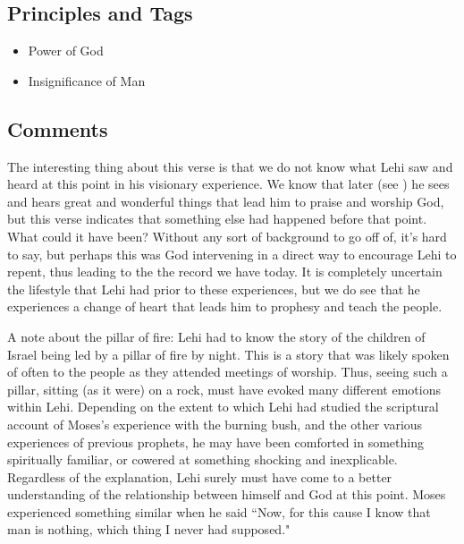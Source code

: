 \documentclass[12pt]{report}
\begin{document}
\subsection{Principles and Tags\label{1Nephi1:6:principles}}
\begin{itemize}
\item {}Power of God
\item {}Insignificance of Man
\end{itemize}

\subsection{Comments\label{1Nephi1:6:comments}}
The interesting thing about this verse is that we do not know what Lehi saw and heard at this point in his visionary experience.  We know that later (see ) he sees and hears great and wonderful things that lead him to praise and worship God, but this verse indicates that something else had happened before that point.  What could it have been?  Without any sort of background to go off of, it's hard to say, but perhaps this was God intervening in a direct way to encourage Lehi to repent, thus leading to the the record we have today.  It is completely uncertain the lifestyle that Lehi had prior to these experiences, but we do see that he experiences a change of heart that leads him to prophesy and teach the people.

A note about the pillar of fire: Lehi had to know the story of the children of Israel being led by a pillar of fire by night. This is a story that was likely spoken of often to the people as they attended meetings of worship.  Thus, seeing such a pillar, sitting (as it were) on a rock, must have evoked many different emotions within Lehi.  Depending on the extent to which Lehi had studied the scriptural account of Moses's experience with the burning bush, and the other various experiences of previous prophets, he may have been comforted in something spiritually familiar, or cowered at something shocking and inexplicable.  Regardless of the explanation, Lehi surely must have come to a better understanding of the relationship between himself and God at this point.  Moses experienced something similar when he said ``Now, for this cause I know that man is nothing, which thing I never had supposed."
\end{document}
